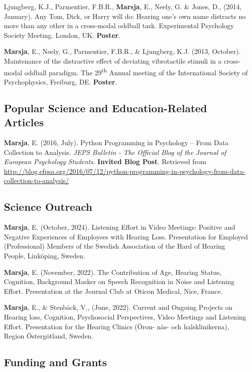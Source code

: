 \documentclass[]{article}
\begin{document}
Ljungberg, K.J., Parmentier, F.B.R., \textbf{Marsja}, E., Neely, G. \&
Jones, D., (2014, January). Any Tom, Dick, or Harry will do: Hearing
one's own name distracts no more than any other in a cross-modal oddball
task. Experimental Psychology Society Meeting. London, UK.
\textbf{Poster}.

\textbf{Marsja}, E., Neely, G., Parmentier, F.B.R., \& Ljungberg, K.J.
(2013, October). Maintenance of the distractive effect of deviating
vibrotactile stimuli in a cross-modal oddball paradigm. The
29\textsuperscript{th} Annual meeting of the International Society of
Psychophysics, Freiburg, DE. \textbf{Poster}.

\subsection{Popular Science and Education-Related
Articles}\label{popular-science-and-education-related-articles}

\textbf{Marsja}, E. (2016, July). Python Programming in Psychology --
From Data Collection to Analysis. \emph{JEPS Bulletin - The Official
Blog of the Journal of European Psychology Students}. \textbf{Invited
Blog Post}. Retrieved from
\sloppy \url{http://blog.efpsa.org/2016/07/12/python-programming-in-psychology-from-data-collection-to-analysis/}

\subsection{Science Outreach}\label{science-outreach}

\textbf{Marsja}, E. (October, 2024). Listening Effort in Video Meetings:
Positive and Negative Experiences of Employees with Hearing Loss.
Presentation for Employed (Professional) Members of the Swedish
Association of the Hard of Hearing People, Linköping, Sweden.

\textbf{Marsja}, E. (November, 2022). The Contribution of Age, Hearing
Status, Cognition, Background Masker on Speech Recognition in Noise and
Listening Effort. Presentation at the Journal Club at Oticon Medical,
Nice, France.

\textbf{Marsja}, E., \& Stenbäck, V., (June, 2022). Current and Ongoing
Projects on Hearing loss, Cognition, Psychosocial Perspectives, Video
Meetings and Listening Effort. Presentation for the Hearing Clinics
(Öron- näs- och halsklinikerna), Region Östergötland, Sweden.

\subsection{Funding and Grants}\label{funding-and-grants}
\end{document}

